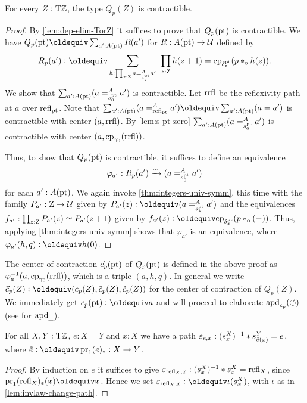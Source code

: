 \documentclass[a4paper,12pt]{amsart}
\begin{document}
\begin{lemma}\label{lem:guided-null-hmtps-dep}
  For every $Z:{\mathrm{T}\mathbb{Z}}$, the type $Q_p(Z)$ is contractible.
\end{lemma}
\begin{proof}
  By \cref{lem:dep-elim-TorZ} it suffices to prove that $Q_p({\mathord{\mathrm{pt}}})$ is contractible.
  We have $Q_p(\pt)\jdeq \sum_{a':A(\pt)} R(a')$ for $R : A({\mathord{\mathrm{pt}}}) \to \mathcal{U}$ defined by
  \[
    R_p(a') \defeq \sum_{h : \prod_{z:\zet} a =^A_{s^\pt_z} a'}~
    \prod_{z:\zet} h(z+1) = \cp{\delta^\pt_z}(p \cto h(z)).
  \]
  We show that $\sum_{a':A({\mathord{\mathrm{pt}}})} (a =^A_{s^{\mathord{\mathrm{pt}}}_0} {a'})$ is contractible.
  Let $\mathrm{rrfl}$ be the reflexivity path at $a$ over $\mathop{{\mathrm{refl}}_{{\mathord{\mathrm{pt}}}}}$.
  Note that $\sum_{a':A(\pt)} (a =^A_{\refl{\pt}} a') \jdeq \sum_{a':A(\pt)} (a = a')$
  is contractible with center $(a,\mathrm{rrfl})$. By \cref{lem:s-pt-zero}
  $\sum_{a':A({\mathord{\mathrm{pt}}})} (a =^A_{s^{\mathord{\mathrm{pt}}}_0} {a'})$ is contractible with center
  $(a,\mathrm{cp}_{\gamma_0}(\mathrm{rrfl}))$.

  Thus, to show that $Q_p({\mathord{\mathrm{pt}}})$ is contractible,
  it suffices to define an equivalence
  \[
    \varphi_{a'} : R_p(a') \xrightarrow{\sim}{} (a =^A_{s^{\mathord{\mathrm{pt}}}_0} {a'})
  \]
  for each $a' : A({\mathord{\mathrm{pt}}})$.
  We again invoke \cref{thm:integers-univ-symm},
  this time with the family $P_{a'} : \mathrm{Z} \to \mathcal{U}$ given
  by $P_{a'}(z) \defeq (a =^A_{s^\pt_z} {a'})$
  and the equivalences $f_{a'} : \prod_{z:\mathrm{Z}} P_{a'}(z)\simeq P_{a'}(z+1)$
  given by $f_{a'}(z) \defeq \cp{\delta^\pt_z}(p \cto ({-}))$.
  Thus, applying \cref{thm:integers-univ-symm}
  shows that $\varphi_{a'}$ is an equivalence,
  where $\varphi_{a'}(h,q) \defeq h(0)$.
\end{proof}

The center of contraction $\vec{c}_p({\mathord{\mathrm{pt}}})$ of $Q_p({\mathord{\mathrm{pt}}})$ is
defined in the above proof as $\varphi_{a}^{-1}(a,\mathrm{cp}_{\gamma_0}(\mathrm{rrfl}))$,
which is a triple $(a,h,q)$. In general we write
$\vec{c}_p(Z)\defeq(c_p(Z),\tilde{c}_p(Z),\hat{c}_p(Z))$
for the center of contraction of $Q_p(Z)$.
We immediately get $c_p(\pt)\defeq a$ and will proceed to
elaborate $\mathop{{\mathrm{apd}}_{c_p}}({\circlearrowleft})$ (see \cite[2.3]{hottbook} for $\mathop{{\mathrm{apd}}_{\_}}$).


\begin{lemma}\label{lem:s-X-x-*-e}
  For all $X,Y:{\mathrm{T}\mathbb{Z}}$, $e: X=Y$ and $x:X$ we have a path
  $\varepsilon_{e,x} : (s^X_x)^{-1} * s^Y_{\tilde {e}(x)} = e$,
  where $\ptoe{e}\defeq \pr_1(e)_* : X\to Y$.
\end{lemma}
\begin{proof}
By induction on $e$ it suffices to give
$\varepsilon_{\mathop{{\mathrm{refl}}_{X}},x} : (s^X_x)^{-1} * s^X_x = \mathop{{\mathrm{refl}}_{X}}$,
since $\pr_1(\refl{X})_*(x) \jdeq x$.
Hence we set $\varepsilon_{\refl{X},x} \defeq \iota(s^X_x)$,
with $\iota$ as in \cref{lem:invlaw-change-path}.
\end{proof}
\end{document}
